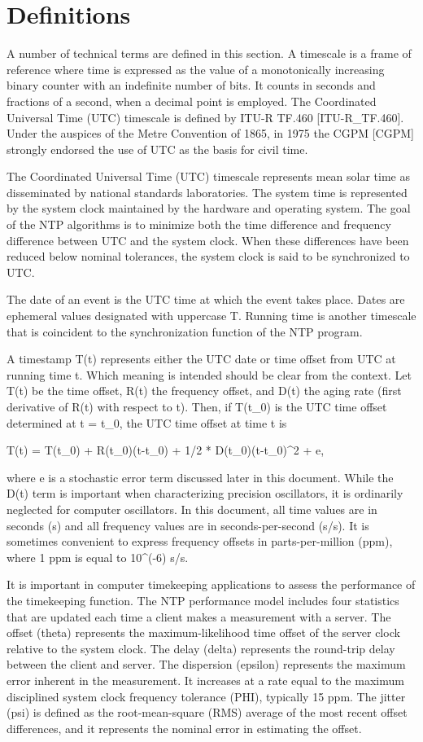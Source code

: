 \chapter{Definitions}

A number of technical terms are defined in this section. A timescale
is a frame of reference where time is expressed as the value of a
monotonically increasing binary counter with an indefinite number of
bits. It counts in seconds and fractions of a second, when a decimal
point is employed. The Coordinated Universal Time (UTC) timescale is
defined by ITU-R TF.460 [ITU-R_TF.460]. Under the auspices of the
Metre Convention of 1865, in 1975 the CGPM [CGPM] strongly endorsed
the use of UTC as the basis for civil time.

The Coordinated Universal Time (UTC) timescale represents mean solar
time as disseminated by national standards laboratories. The system
time is represented by the system clock maintained by the hardware
and operating system. The goal of the NTP algorithms is to minimize
both the time difference and frequency difference between UTC and the
system clock. When these differences have been reduced below nominal
tolerances, the system clock is said to be synchronized to UTC.

The date of an event is the UTC time at which the event takes place.
Dates are ephemeral values designated with uppercase T. Running time
is another timescale that is coincident to the synchronization
function of the NTP program.

A timestamp T(t) represents either the UTC date or time offset from
UTC at running time t. Which meaning is intended should be clear
from the context. Let T(t) be the time offset, R(t) the frequency
offset, and D(t) the aging rate (first derivative of R(t) with
respect to t). Then, if T(t_0) is the UTC time offset determined at
t = t_0, the UTC time offset at time t is

T(t) = T(t_0) + R(t_0)(t-t_0) + 1/2 * D(t_0)(t-t_0)^2 + e,

where e is a stochastic error term discussed later in this document.
While the D(t) term is important when characterizing precision
oscillators, it is ordinarily neglected for computer oscillators. In
this document, all time values are in seconds (s) and all frequency
values are in seconds-per-second (s/s). It is sometimes convenient
to express frequency offsets in parts-per-million (ppm), where 1 ppm
is equal to 10^(-6) s/s.

It is important in computer timekeeping applications to assess the
performance of the timekeeping function. The NTP performance model
includes four statistics that are updated each time a client makes a
measurement with a server. The offset (theta) represents the
maximum-likelihood time offset of the server clock relative to the
system clock. The delay (delta) represents the round-trip delay
between the client and server. The dispersion (epsilon) represents
the maximum error inherent in the measurement. It increases at a
rate equal to the maximum disciplined system clock frequency
tolerance (PHI), typically 15 ppm. The jitter (psi) is defined as
the root-mean-square (RMS) average of the most recent offset
differences, and it represents the nominal error in estimating the
offset.

